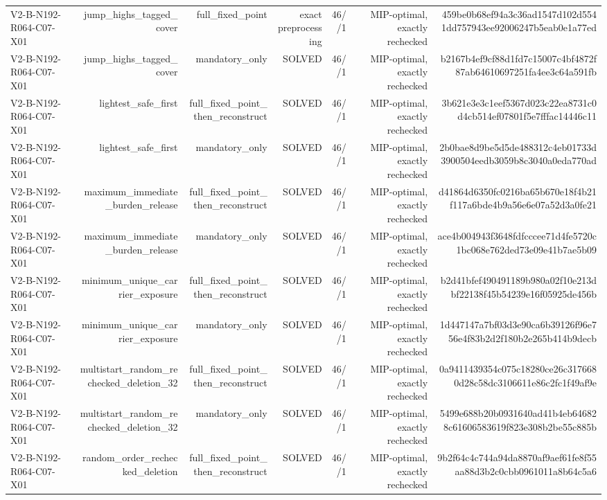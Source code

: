 {\begin{longtable}{lrrrrrr}
V2-B-N192-R064-C07-X01 & jump\_highs\_tagged\_cover & full\_fixed\_point & exact preprocessing & 46//1 & MIP-optimal, exactly rechecked & 459be0b68ef94a3c36ad1547d102d5541dd757943ee92006247b5eab0e1a77ed \\
V2-B-N192-R064-C07-X01 & jump\_highs\_tagged\_cover & mandatory\_only & SOLVED & 46//1 & MIP-optimal, exactly rechecked & b2167b4ef9cf88d1fd7c15007c4bf4872f87ab64610697251fa4ee3c64a591fb \\
V2-B-N192-R064-C07-X01 & lightest\_safe\_first & full\_fixed\_point\_then\_reconstruct & SOLVED & 46//1 & MIP-optimal, exactly rechecked & 3b621e3e3c1eef5367d023c22ea8731c0d4cb514ef07801f5e7fffac14446c11 \\
V2-B-N192-R064-C07-X01 & lightest\_safe\_first & mandatory\_only & SOLVED & 46//1 & MIP-optimal, exactly rechecked & 2b0bae8d9be5d5de488312c4eb01733d3900504eedb3059b8c3040a0eda770ad \\
V2-B-N192-R064-C07-X01 & maximum\_immediate\_burden\_release & full\_fixed\_point\_then\_reconstruct & SOLVED & 46//1 & MIP-optimal, exactly rechecked & d41864d6350fc0216ba65b670e18f4b21f117a6bde4b9a56e6e07a52d3a0fe21 \\
V2-B-N192-R064-C07-X01 & maximum\_immediate\_burden\_release & mandatory\_only & SOLVED & 46//1 & MIP-optimal, exactly rechecked & ace4b004943f3648fdfcccee71d4fe5720c1bc068e762ded73e09e41b7ae5b09 \\
V2-B-N192-R064-C07-X01 & minimum\_unique\_carrier\_exposure & full\_fixed\_point\_then\_reconstruct & SOLVED & 46//1 & MIP-optimal, exactly rechecked & b2d41bfef490491189b980a02f10e213dbf22138f45b54239e16f05925de456b \\
V2-B-N192-R064-C07-X01 & minimum\_unique\_carrier\_exposure & mandatory\_only & SOLVED & 46//1 & MIP-optimal, exactly rechecked & 1d447147a7bf03d3e90ca6b39126f96e756e4f83b2d2f180b2e265b414b9decb \\
V2-B-N192-R064-C07-X01 & multistart\_random\_rechecked\_deletion\_32 & full\_fixed\_point\_then\_reconstruct & SOLVED & 46//1 & MIP-optimal, exactly rechecked & 0a9411439354c075c18280ce26c3176680d28c58dc3106611e86c2fc1f49af9e \\
V2-B-N192-R064-C07-X01 & multistart\_random\_rechecked\_deletion\_32 & mandatory\_only & SOLVED & 46//1 & MIP-optimal, exactly rechecked & 5499e688b20b0931640ad41b4eb646828c61606583619f823e308b2be55c885b \\
V2-B-N192-R064-C07-X01 & random\_order\_rechecked\_deletion & full\_fixed\_point\_then\_reconstruct & SOLVED & 46//1 & MIP-optimal, exactly rechecked & 9b2f64c4c744a94da8870af9aef61fe8f55aa88d3b2c0cbb0961011a8b64c5a6 \\

\end{longtable}}
